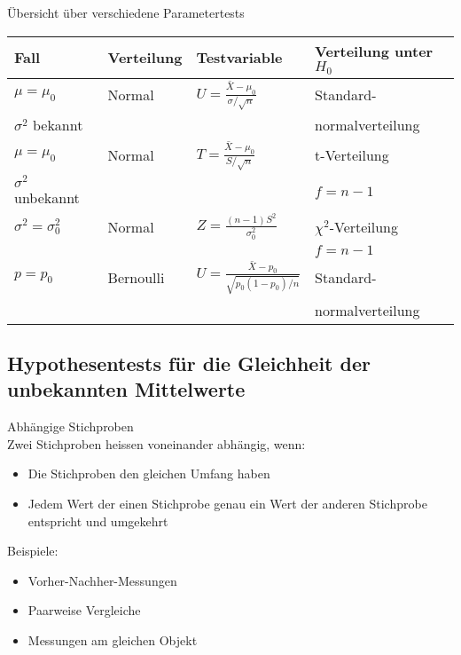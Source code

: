 \begin{theorem}{Übersicht über verschiedene Parametertests}\\
\begin{center}
\begin{tabular}{|l|l|l|l|}
\hline
Fall & Verteilung & Testvariable & Verteilung unter $H_0$ \\
\hline
$\mu=\mu_0$ & Normal & $U=\frac{\bar{X}-\mu_0}{\sigma/\sqrt{n}}$ & Standard- \\
$\sigma^2$ bekannt & & & normalverteilung \\
\hline
$\mu=\mu_0$ & Normal & $T=\frac{\bar{X}-\mu_0}{S/\sqrt{n}}$ & t-Verteilung \\
$\sigma^2$ unbekannt & & & $f=n-1$ \\
\hline
$\sigma^2=\sigma_0^2$ & Normal & $Z=\frac{(n-1)S^2}{\sigma_0^2}$ & $\chi^2$-Verteilung \\
& & & $f=n-1$ \\
\hline
$p=p_0$ & Bernoulli & $U=\frac{\bar{X}-p_0}{\sqrt{p_0(1-p_0)/n}}$ & Standard- \\
& & & normalverteilung \\
\hline
\end{tabular}
\end{center}
\end{theorem}

\subsection{Hypothesentests für die Gleichheit der unbekannten Mittelwerte}

\begin{definition}{Abhängige Stichproben}\\
Zwei Stichproben heissen voneinander abhängig, wenn:
\begin{itemize}
  \item Die Stichproben den gleichen Umfang haben
  \item Jedem Wert der einen Stichprobe genau ein Wert der anderen Stichprobe entspricht und umgekehrt
\end{itemize}

Beispiele:
\begin{itemize}
  \item Vorher-Nachher-Messungen
  \item Paarweise Vergleiche
  \item Messungen am gleichen Objekt
\end{itemize}
\end{definition}

